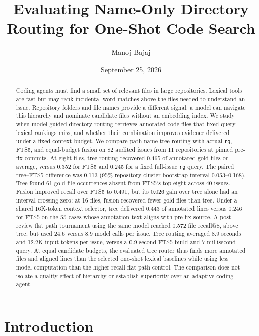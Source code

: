 \documentclass[
]{article}
\title{Evaluating Name-Only Directory Routing for One-Shot Code Search}
\author{Manoj Bajaj}
\date{September 25, 2026}
\begin{document}
\maketitle

\begin{abstract}

Coding agents must find a small set of relevant files in large
repositories. Lexical tools are fast but may rank incidental word
matches above the files needed to understand an issue. Repository
folders and file names provide a different signal: a model can navigate
this hierarchy and nominate candidate files without an embedding index.
We study when model-guided directory routing retrieves annotated
code files that fixed-query lexical rankings miss, and whether their
combination improves evidence delivered under a fixed context budget. We
compare path-name tree routing with actual \texttt{rg}, FTS5, and
equal-budget fusion on 82 audited issues from 11 repositories at pinned
pre-fix commits. At eight files, tree routing recovered 0.465 of
annotated gold files on average, versus 0.352 for FTS5 and 0.245 for a
fixed full-issue \texttt{rg} query. The paired tree--FTS5 difference was
0.113 (95\% repository-cluster bootstrap interval 0.053--0.168). Tree
found 61 gold-file occurrences absent from FTS5's top eight across 40
issues. Fusion improved recall over FTS5 to 0.491, but its 0.026 gain
over tree alone had an interval crossing zero; at 16 files, fusion
recovered fewer gold files than tree. Under a shared 16K-token context
selector, tree delivered 0.443 of annotated lines versus 0.246 for
FTS5 on the 55 cases whose annotation text aligns with pre-fix source.
A post-review flat path tournament using the same model reached 0.572
file recall@8, above tree, but used 24.6 versus 8.9 model calls per
issue. Tree routing averaged 8.9 seconds and 12.2K input tokens per
issue, versus a 0.9-second FTS5 build and 7-millisecond query.
At equal candidate budgets, the evaluated tree router thus finds more
annotated files and aligned lines than the selected one-shot lexical
baselines while using less model computation than the higher-recall
flat path control. The comparison does not isolate a quality effect of
hierarchy or establish superiority over an adaptive coding agent.
\end{abstract}

\section{Introduction}\label{introduction}
\end{document}
